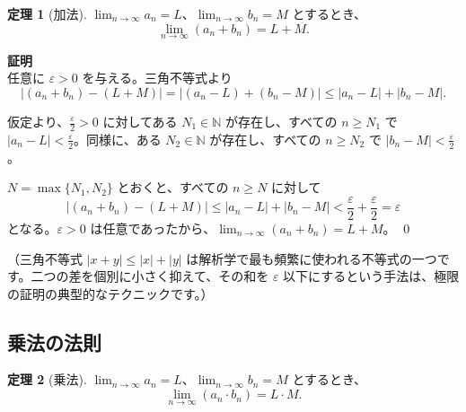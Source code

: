 \documentclass[11pt,a4paper]{jsarticle}
\theoremstyle{definition}
\newtheorem{theorem}{定理}[section]
\newcommand{\N}{\mathbb{N}}
\newcommand{\eps}{\varepsilon}
\newcommand{\kaisetsu}[1]{\textcolor{darkblue!70!black}{\small（#1）}}
\begin{document}
\begin{theorembox}[定理：和の極限]
\begin{theorem}[加法]\label{thm:addition}
$\lim_{n \to \infty} a_n = L$、$\lim_{n \to \infty} b_n = M$ とするとき、
\[
\lim_{n \to \infty} (a_n + b_n) = L + M.
\]
\end{theorem}
\end{theorembox}

\begin{proofbox}
\textbf{証明}\ \\
\noindent
任意に $\eps > 0$ を与える。三角不等式より
\[
|(a_n + b_n) - (L + M)|
= |(a_n - L) + (b_n - M)|
\leq |a_n - L| + |b_n - M|.
\]

仮定より、$\frac{\eps}{2} > 0$ に対してある $N_1 \in \N$ が存在し、すべての $n \geq N_1$ で $|a_n - L| < \frac{\eps}{2}$。同様に、ある $N_2 \in \N$ が存在し、すべての $n \geq N_2$ で $|b_n - M| < \frac{\eps}{2}$。

$N = \max\{N_1, N_2\}$ とおくと、すべての $n \geq N$ に対して
\[
|(a_n + b_n) - (L + M)|
\leq |a_n - L| + |b_n - M|
< \frac{\eps}{2} + \frac{\eps}{2}
= \eps
\]
となる。$\eps > 0$ は任意であったから、$\lim_{n \to \infty} (a_n + b_n) = L + M$。 \qed
\end{proofbox}

\kaisetsu{三角不等式 $|x + y| \leq |x| + |y|$ は解析学で最も頻繁に使われる不等式の一つです。二つの差を個別に小さく抑えて、その和を $\eps$ 以下にするという手法は、極限の証明の典型的なテクニックです。}

\subsection{乗法の法則}

\begin{theorembox}[定理：積の極限]
\begin{theorem}[乗法]\label{thm:multiplication}
$\lim_{n \to \infty} a_n = L$、$\lim_{n \to \infty} b_n = M$ とするとき、
\[
\lim_{n \to \infty} (a_n \cdot b_n) = L \cdot M.
\]
\end{theorem}
\end{theorembox}
\end{document}
